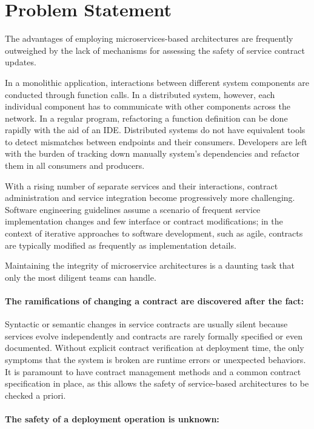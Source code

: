 \section{Problem Statement} %
\label{sec:problem_statement}

The advantages of employing microservices-based architectures are frequently outweighed by the lack of mechanisms for assessing the safety of service contract updates.

In a monolithic application, interactions between different system components are conducted through function calls.
In a distributed system, however, each individual component has to communicate with other components across the network.
In a regular program, refactoring a function definition can be done rapidly with the aid of an IDE.
Distributed systems do not have equivalent tools to detect mismatches between endpoints and their consumers.
Developers are left with the burden of tracking down manually system's dependencies and refactor them in all consumers and producers.

With a rising number of separate services and their interactions, contract administration and service integration become progressively more challenging.
Software engineering guidelines assume a scenario of frequent service implementation changes and few interface or contract modifications;
in the context of iterative approaches to software development, such as agile, contracts are typically modified as frequently as implementation details.

Maintaining the integrity of microservice architectures is a daunting task that only the most diligent teams can handle.

\paragraph{The ramifications of changing a contract are discovered after the fact:}

Syntactic or semantic changes in service contracts are usually silent because services evolve independently and contracts are rarely formally specified or even documented.
Without explicit contract verification at deployment time, the only symptoms that the system is broken are runtime errors or unexpected behaviors.
It is paramount to have contract management methods and a common contract specification in place, as this allows the safety of service-based architectures to be checked a priori.

\paragraph{The safety of a deployment operation is unknown:}


